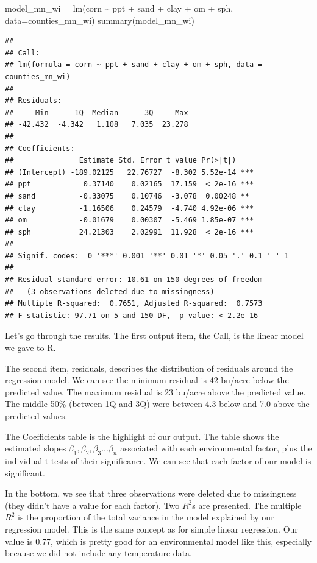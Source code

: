 \documentclass[
]{book}
\newenvironment{Shaded}{\begin{snugshade}}{\end{snugshade}}
\newcommand{\AttributeTok}[1]{\textcolor[rgb]{0.77,0.63,0.00}{#1}}
\newcommand{\FunctionTok}[1]{\textcolor[rgb]{0.00,0.00,0.00}{#1}}
\newcommand{\NormalTok}[1]{#1}
\newcommand{\OtherTok}[1]{\textcolor[rgb]{0.56,0.35,0.01}{#1}}
\newcommand{\SpecialCharTok}[1]{\textcolor[rgb]{0.00,0.00,0.00}{#1}}
\begin{document}
\begin{Shaded}
\begin{Highlighting}[]
\NormalTok{model\_mn\_wi }\OtherTok{=} \FunctionTok{lm}\NormalTok{(corn }\SpecialCharTok{\textasciitilde{}}\NormalTok{ ppt }\SpecialCharTok{+}\NormalTok{ sand }\SpecialCharTok{+}\NormalTok{ clay }\SpecialCharTok{+}\NormalTok{ om }\SpecialCharTok{+}\NormalTok{ sph, }\AttributeTok{data=}\NormalTok{counties\_mn\_wi)}
\FunctionTok{summary}\NormalTok{(model\_mn\_wi)}
\end{Highlighting}
\end{Shaded}

\begin{verbatim}
## 
## Call:
## lm(formula = corn ~ ppt + sand + clay + om + sph, data = counties_mn_wi)
## 
## Residuals:
##     Min      1Q  Median      3Q     Max 
## -42.432  -4.342   1.108   7.035  23.278 
## 
## Coefficients:
##               Estimate Std. Error t value Pr(>|t|)    
## (Intercept) -189.02125   22.76727  -8.302 5.52e-14 ***
## ppt            0.37140    0.02165  17.159  < 2e-16 ***
## sand          -0.33075    0.10746  -3.078  0.00248 ** 
## clay          -1.16506    0.24579  -4.740 4.92e-06 ***
## om            -0.01679    0.00307  -5.469 1.85e-07 ***
## sph           24.21303    2.02991  11.928  < 2e-16 ***
## ---
## Signif. codes:  0 '***' 0.001 '**' 0.01 '*' 0.05 '.' 0.1 ' ' 1
## 
## Residual standard error: 10.61 on 150 degrees of freedom
##   (3 observations deleted due to missingness)
## Multiple R-squared:  0.7651, Adjusted R-squared:  0.7573 
## F-statistic: 97.71 on 5 and 150 DF,  p-value: < 2.2e-16
\end{verbatim}

Let's go through the results. The first output item, the Call, is the linear model we gave to R.

The second item, residuals, describes the distribution of residuals around the regression model. We can see the minimum residual is 42 bu/acre below the predicted value. The maximum residual is 23 bu/acre above the predicted value. The middle 50\% (between 1Q and 3Q) were between 4.3 below and 7.0 above the predicted values.

The Coefficients table is the highlight of our output. The table shows the estimated slopes \(\beta_1, \beta_2, \beta_3...\beta_n\) associated with each environmental factor, plus the individual t-tests of their significance. We can see that each factor of our model is significant.

In the bottom, we see that three observations were deleted due to missingness (they didn't have a value for each factor). Two \(R^2\)s are presented. The multiple \(R^2\) is the proportion of the total variance in the model explained by our regression model. This is the same concept as for simple linear regression. Our value is 0.77, which is pretty good for an environmental model like this, especially because we did not include any temperature data.
\end{document}

